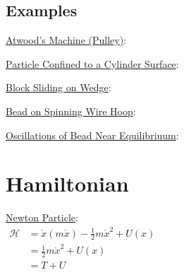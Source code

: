 \documentclass[12pt]{article}
\begin{document}
\newpage
\subsection{Examples}

\vspace{10pt}\noindent
\underline{Atwood's Machine (Pulley)}:

\vspace{20pt}\noindent
\underline{Particle Confined to a Cylinder Surface}:

\vspace{20pt}\noindent
\underline{Block Sliding on Wedge}:

\vspace{20pt}\noindent
\underline{Bead on Spinning Wire Hoop}:

\vspace{20pt}\noindent
\underline{Oscillations of Bead Near Equilibriuum}:

\newpage
\section{Hamiltonian}
\hspace{3cm}
\begin{minipage}[t]{8cm}
    \underline{Newton Particle}:\\[10pt]
    \(\begin{aligned}
        \mathcal{H} &= \dot{x} ( m \dot{x} ) - \tfrac{1}{2} m \dot{x}^2 + U(x) \\[5pt]
        &= \tfrac{1}{2} m \dot{x}^2 + U(x)\\[5pt]
        &= T + U
    \end{aligned}\)    
\end{minipage}
\end{document}
